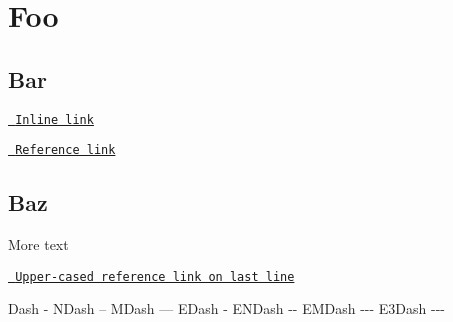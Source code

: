 \hypertarget{md_doxygen_testing_055_markdown_autotoc_md14}{}\section{Foo}\label{md_doxygen_testing_055_markdown_autotoc_md14}
\hypertarget{md_doxygen_testing_055_markdown_autotoc_md15}{}\subsection{Bar}\label{md_doxygen_testing_055_markdown_autotoc_md15}
\href{http://example.com/inline}{\texttt{ Inline link}}

\href{http://example.com/reference}{\texttt{ Reference link}}\hypertarget{md_doxygen_testing_055_markdown_autotoc_md16}{}\subsection{Baz}\label{md_doxygen_testing_055_markdown_autotoc_md16}
More text

\href{http://example.com/last-line}{\texttt{ Upper-\/cased reference link on last line}}

Dash -\/ N\+Dash -- M\+Dash --- E\+Dash -\/ E\+N\+Dash -\/-\/ E\+M\+Dash -\/-\/-\/ E3\+Dash -\/-\/-\/ 